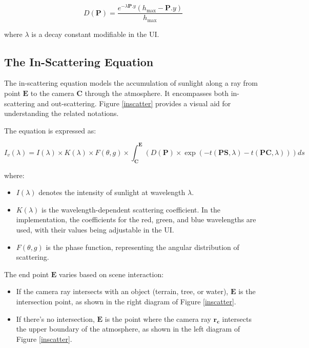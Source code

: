 \begin{equation}
    D(\mathbf{P})=\frac{e^{-\lambda \mathbf{P}.y}\left(h_{\text{max}}-\mathbf{P}.y\right)}{h_{\text{max}}}
\end{equation}

where $\lambda$ is a decay constant modifiable in the UI.

\subsection{The In-Scattering Equation}
\label{The In-Scattering Equation}

The in-scattering equation \cite{nishita_display_1993} models the accumulation of sunlight along a ray from point $\mathbf{E}$ to the camera $\mathbf{C}$ through the atmosphere. It encompasses both in-scattering and out-scattering. Figure \ref{inscatter} provides a visual aid for understanding the related notations.

The equation is expressed as:

\begin{equation}
    I_v(\lambda) = I(\lambda) \times K(\lambda) \times F(\theta, g) \times \int_{\mathbf{C}}^{\mathbf{E}} \left( D(\mathbf{P}) \times \exp\left(-t\left({{\mathbf{PS}},\lambda}\right) -t \left({{\mathbf{PC}},\lambda}\right) \right)\right) ds
\end{equation}

where:
\begin{itemize}
    \item $I(\lambda)$ denotes the intensity of sunlight at wavelength $\lambda$.
    \item $K(\lambda)$ is the wavelength-dependent scattering coefficient. In the implementation, the coefficients for the red, green, and blue wavelengths are used, with their values being adjustable in the UI.
    \item $F(\theta, g)$ is the phase function, representing the angular distribution of scattering.
\end{itemize}

The end point $\mathbf{E}$ varies based on scene interaction:
\begin{itemize}
    \item If the camera ray intersects with an object (terrain, tree, or water), $\mathbf{E}$ is the intersection point, as shown in the right diagram of Figure \ref{inscatter}.
    \item If there's no intersection, $\mathbf{E}$ is the point where the camera ray $\mathbf{r_c}$ intersects the upper boundary of the atmosphere, as shown in the left diagram of Figure \ref{inscatter}.
\end{itemize}

